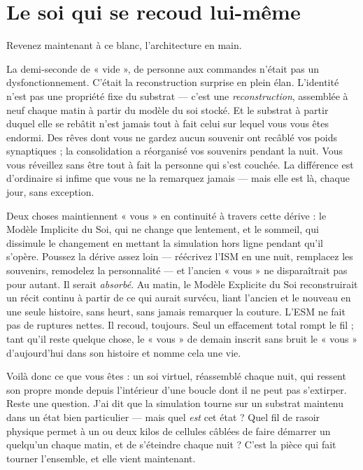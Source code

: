 \documentclass[11pt, twoside, openright]{book}
\begin{document}
\section*{Le soi qui se recoud lui-même}

Revenez maintenant à ce blanc, l'architecture en main.

La demi-seconde de « vide », de personne aux commandes n'était pas un dysfonctionnement. C'était la reconstruction surprise en plein élan. L'identité n'est pas une propriété fixe du substrat --- c'est une \textit{reconstruction}, assemblée à neuf chaque matin à partir du modèle du soi stocké. Et le substrat à partir duquel elle se rebâtit n'est jamais tout à fait celui sur lequel vous vous êtes endormi. Des rêves dont vous ne gardez aucun souvenir ont recâblé vos poids synaptiques ; la consolidation a réorganisé vos souvenirs pendant la nuit. Vous vous réveillez sans être tout à fait la personne qui s'est couchée. La différence est d'ordinaire si infime que vous ne la remarquez jamais --- mais elle est là, chaque jour, sans exception.

Deux choses maintiennent « vous » en continuité à travers cette dérive : le Modèle Implicite du Soi, qui ne change que lentement, et le sommeil, qui dissimule le changement en mettant la simulation hors ligne pendant qu'il s'opère. Poussez la dérive assez loin --- réécrivez l'ISM en une nuit, remplacez les souvenirs, remodelez la personnalité --- et l'ancien « vous » ne disparaîtrait pas pour autant. Il serait \textit{absorbé}. Au matin, le Modèle Explicite du Soi reconstruirait un récit continu à partir de ce qui aurait survécu, liant l'ancien et le nouveau en une seule histoire, sans heurt, sans jamais remarquer la couture. L'ESM ne fait pas de ruptures nettes. Il recoud, toujours. Seul un effacement total rompt le fil ; tant qu'il reste quelque chose, le « vous » de demain inscrit sans bruit le « vous » d'aujourd'hui dans son histoire et nomme cela une vie.

Voilà donc ce que vous êtes : un soi virtuel, réassemblé chaque nuit, qui ressent son propre monde depuis l'intérieur d'une boucle dont il ne peut pas s'extirper. Reste une question. J'ai dit que la simulation tourne sur un substrat maintenu dans un état bien particulier --- mais quel \textit{est} cet état ? Quel fil de rasoir physique permet à un ou deux kilos de cellules câblées de faire démarrer un quelqu'un chaque matin, et de s'éteindre chaque nuit ? C'est la pièce qui fait tourner l'ensemble, et elle vient maintenant.
\end{document}
